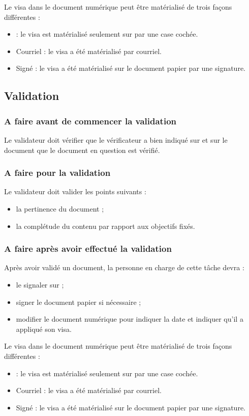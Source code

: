 Le visa dans le document numérique peut être matérialisé de trois façons différentes :
\begin{itemize}
\item \lintranet : le visa est matérialisé seulement sur \lintranet par une case cochée.
\item Courriel : le visa a été matérialisé par courriel.
\item Signé : le visa a été matérialisé sur le document papier par une signature.
\end{itemize}

\subsection{Validation}

\subsubsection*{A faire avant de commencer la validation}
Le validateur doit vérifier que le vérificateur a bien indiqué sur \lintranet et sur le document que le document en question est vérifié.

\subsubsection*{A faire pour la validation}
Le validateur doit valider les points suivants :
\begin{itemize}
\item la pertinence du document ;
\item la complétude du contenu par rapport aux objectifs fixés.
\end{itemize}

\subsubsection*{A faire après avoir effectué la validation}
Après avoir validé un document, la personne en charge de cette tâche devra :
\begin{itemize}
\item le signaler sur \lintranet ;
\item signer le document papier si nécessaire ;
\item modifier le document numérique pour indiquer la date et indiquer qu'il a appliqué son
visa.
\end{itemize}

Le visa dans le document numérique peut être matérialisé de trois façons différentes :
\begin{itemize}
\item \lintranet : le visa est matérialisé seulement sur \lintranet par une case cochée.
\item Courriel : le visa a été matérialisé par courriel.
\item Signé : le visa a été matérialisé sur le document papier par une signature.
\end{itemize}


